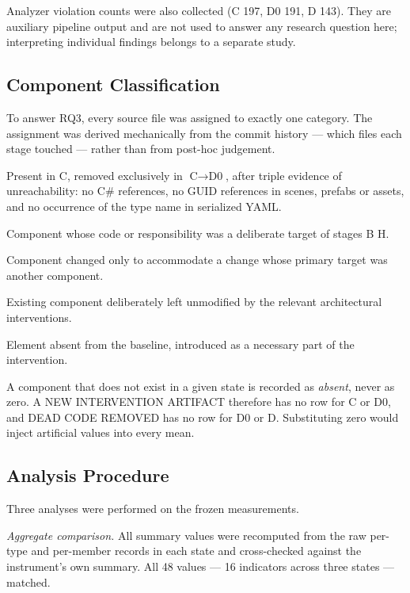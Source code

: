 \documentclass{sbc2019}%
\begin{document}
Analyzer violation counts were also collected (C 197, D0 191, D 143). They are
auxiliary pipeline output and are not used to answer any research question here;
interpreting individual findings belongs to a separate study.

\subsection{Component Classification}

To answer RQ3, every source file was assigned to exactly one category. The
assignment was derived mechanically from the commit history --- which files each
stage touched --- rather than from post-hoc judgement.

\begin{description}\itemsep2pt
\item[DEAD CODE REMOVED] Present in C, removed exclusively in $\text{C}\rightarrow\text{D0}$,
after triple evidence of unreachability: no C\# references, no GUID references in
scenes, prefabs or assets, and no occurrence of the type name in serialized YAML\@.
\item[DIRECTLY REFACTORED] Component whose code or responsibility was a deliberate
target of stages B\textendash{} H.
\item[INDIRECTLY AFFECTED] Component changed only to accommodate a change whose
primary target was another component.
\item[PRESERVED] Existing component deliberately left unmodified by the relevant
architectural interventions.
\item[NEW INTERVENTION ARTIFACT] Element absent from the baseline, introduced as a
necessary part of the intervention.
\end{description}

A component that does not exist in a given state is recorded as \emph{absent},
never as zero. A NEW INTERVENTION ARTIFACT therefore has no row for C or D0, and
DEAD CODE REMOVED has no row for D0 or D. Substituting zero would inject
artificial values into every mean.

\subsection{Analysis Procedure}

Three analyses were performed on the frozen measurements.

\emph{Aggregate comparison.} All summary values were recomputed from the raw
per-type and per-member records in each state and cross-checked against the
instrument's own summary. All 48 values --- 16 indicators across three states ---
matched.
\end{document}
